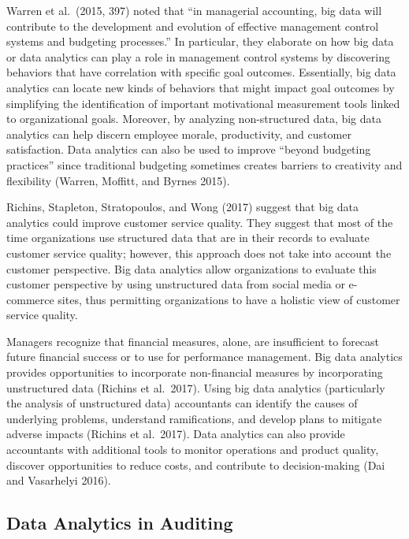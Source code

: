 \documentclass[
]{book}
\begin{document}
Warren et al.~(2015, 397) noted that ``in managerial accounting, big data will contribute to the development and evolution of effective management control systems and budgeting processes.'' In particular, they elaborate on how big data or data analytics can play a role in management control systems by discovering behaviors that have correlation with specific goal outcomes. Essentially, big data analytics can locate new kinds of behaviors that might impact goal outcomes by simplifying the identification of important motivational measurement tools linked to organizational goals. Moreover, by analyzing non-structured data, big data analytics can help discern employee morale, productivity, and customer satisfaction. Data analytics can also be used to improve ``beyond budgeting practices'' since traditional budgeting sometimes creates barriers to creativity and flexibility (Warren, Moffitt, and Byrnes 2015).

Richins, Stapleton, Stratopoulos, and Wong (2017) suggest that big data analytics could improve customer service quality. They suggest that most of the time organizations use structured data that are in their records to evaluate customer service quality; however, this approach does not take into account the customer perspective. Big data analytics allow organizations to evaluate this customer perspective by using unstructured data from social media or e-commerce sites, thus permitting organizations to have a holistic view of customer service quality.

Managers recognize that financial measures, alone, are insufficient to forecast future financial success or to use for performance management. Big data analytics provides opportunities to incorporate non-financial measures by incorporating unstructured data (Richins et al.~2017). Using big data analytics (particularly the analysis of unstructured data) accountants can identify the causes of underlying problems, understand ramifications, and develop plans to mitigate adverse impacts (Richins et al.~2017). Data analytics can also provide accountants with additional tools to monitor operations and product quality, discover opportunities to reduce costs, and contribute to decision-making (Dai and Vasarhelyi 2016).

\hypertarget{data-analytics-in-auditing}{%
\subsection{Data Analytics in Auditing}\label{data-analytics-in-auditing}}
\end{document}
